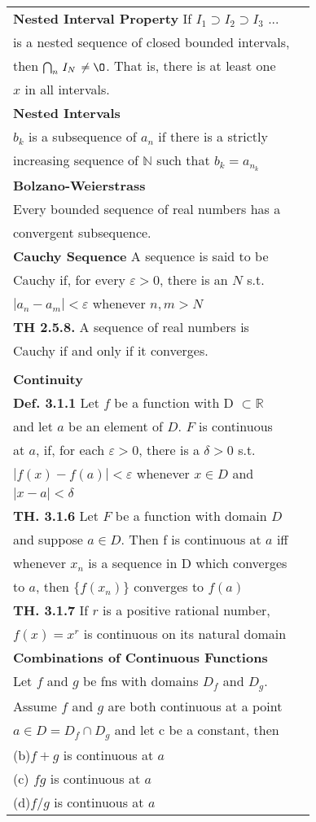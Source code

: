 \documentclass[10 pt,landscape]{article}
\begin{document}
\begin{multicols}{4}
\begin{tabular}{@{}ll@{}}
\textbf{Nested Interval Property} If $I_1\supset I_2 \supset I_3$ ... \\
is a nested sequence of closed bounded intervals,\\ then $\bigcap _n \, I_N\, \ne \O $. That is, there is at least one \\ $x$ in all intervals.\\
\textbf{Nested Intervals}\\
$b_k$ is a subsequence of $a_n$ if there is a strictly \\increasing  sequence of $\mathbb{N}$ such that $b_k=a_{n_k}$\\
\textbf{Bolzano-Weierstrass}\\
Every bounded sequence of real numbers has a\\ convergent subsequence.\\
\textbf{Cauchy Sequence} A sequence is said to be \\Cauchy if, for every $\varepsilon >0$, there is an $N$ s.t. \\
$|a_n-a_m|<\varepsilon $ whenever $n,m>N$\\
\textbf{TH 2.5.8.} A sequence of real numbers is \\Cauchy if and only if it converges.\\
\\
\textbf{Continuity}\\
\textbf{Def. 3.1.1} Let $f$ be a function with D $\subset \mathbb{R}$\\
and let $a$ be an element of $D$. $F$ is continuous\\ at $a$, if, for each $\varepsilon >0$, there is a $\delta >0$ s.t. \\ $|f(x)-f(a)|< \varepsilon $ whenever $x \in D$ and \\$|x-a|< \delta$\\
\textbf{TH. 3.1.6} Let $F$ be a function with domain $D$\\
and suppose $a \in D$. Then f is continuous at $a$ iff\\ whenever $x_n$ is a sequence in D which converges\\ to $a$, then $\{f(x_n)\}$ converges to $f(a)$\\
\textbf{TH. 3.1.7} If $r$ is a positive rational number,\\ $f(x)=x^r$ is continuous on its natural domain\\
\textbf{Combinations of Continuous Functions}\\ Let $f$ and $g$ be fns with domains $D_f$ and $D_g$.\\ Assume $f$ and $g$ are both continuous at a point \\ $a \in D=D_f\cap D_g$ and let c be a constant, then\\
(b)$f+g$ is continuous at $a$\\
(c) $fg$ is continuous at $a$\\
(d)$f/g$ is continuous at $a$\\


\end{tabular}
\end{multicols}
\end{document}
